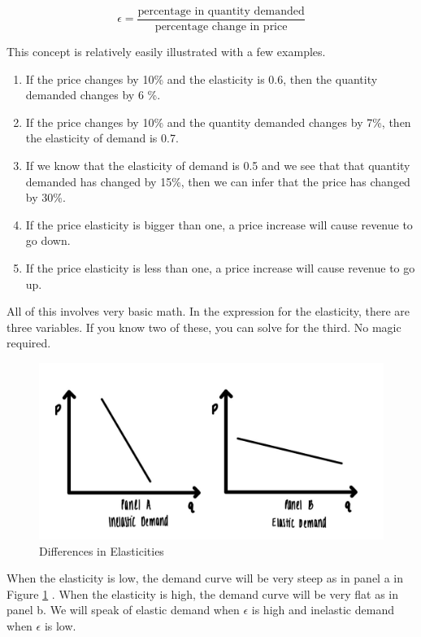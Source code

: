 \documentclass[
]{book}
\providecommand{\tightlist}{%
  \setlength{\itemsep}{0pt}\setlength{\parskip}{0pt}}
\begin{document}
\[\epsilon=\frac{\text{percentage in quantity demanded}}{\text{percentage change in price}}\]

This concept is relatively easily illustrated with a few examples.

\begin{enumerate}
\def\labelenumi{\arabic{enumi}.}
\tightlist
\item
  If the price changes by 10\% and the elasticity is 0.6, then the quantity demanded changes by 6 \%.
\item
  If the price changes by 10\% and the quantity demanded changes by 7\%, then the elasticity of demand is 0.7.
\item
  If we know that the elasticity of demand is 0.5 and we see that that quantity demanded has changed by 15\%, then we can infer that the price has changed by 30\%.
\item
  If the price elasticity is bigger than one, a price increase will cause revenue to go down.
\item
  If the price elasticity is less than one, a price increase will cause revenue to go up.
\end{enumerate}

All of this involves very basic math. In the expression for the elasticity, there are three variables. If you know two of these, you can solve for the third. No magic required.

\begin{figure}

{\centering \includegraphics[width=1\linewidth]{img/ch3/fig4} 

}

\caption{Differences in Elasticities}\label{fig:fig304}
\end{figure}

When the elasticity is low, the demand curve will be very steep as in panel a in Figure \ref{fig:fig304} . When the elasticity is high, the demand curve will be very flat as in panel b. We will speak of elastic demand when \(\epsilon\) is high and inelastic demand when \(\epsilon\) is low.
\end{document}
